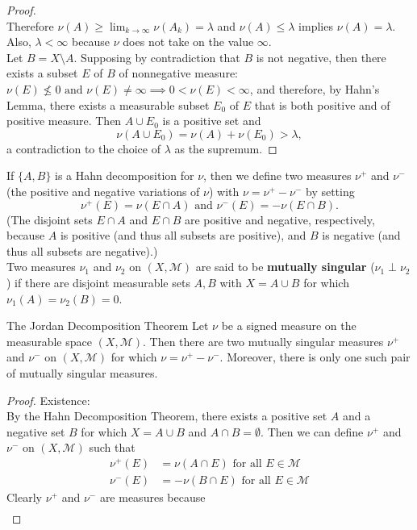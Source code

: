 \begin{flushleft}
\begin{proof}
\[		\]
		Therefore $\nu(A)\ge\lim_{k\to\infty}\nu(A_k)=\lambda$ and $\nu(A)\le\lambda$ implies $\nu(A)=\lambda$.
		Also, $\lambda<\infty$ because $\nu$ does not take on the value $\infty$.
		\\Let $B=X\setminus A$.
		Supposing by contradiction that $B$ is not negative, then there exists a subset $E$ of $B$ of nonnegative measure: $\nu(E)\not\le0\text{ and }\nu(E)\neq\infty\implies 0<\nu(E)<\infty$, and therefore, by Hahn's Lemma, there exists a measurable subset $E_0$ of $E$ that is both positive and of positive measure.
		Then $A\cup E_0$ is a positive set and 
		\[
			\nu(A\cup E_0)=\nu(A)+\nu(E_0)>\lambda,
		\]
		a contradiction to the choice of $\lambda$ as the supremum.
	\end{proof}
	If $\{A,B\}$ is a Hahn decomposition for $\nu$, then we define two measures $\nu^+$ and $\nu^-$ (the positive and negative variations of $\nu$) with $\nu=\nu^+-\nu^-$ by setting
	\[
		\nu^+(E)=\nu(E\cap A)\text{ and }\nu^-(E)=-\nu(E\cap B).	
	\]
	(The disjoint sets $E\cap A$ and $E\cap B$ are positive and negative, respectively, because $A$ is positive (and thus all subsets are positive), and $B$ is negative (and thus all subsets are negative).) 
	\\\bigskip Two measures $\nu_1$ and $\nu_2$ on $(X,\mathcal{M})$ are said to be \textbf{mutually singular} ($\nu_1\perp\nu_2$) if there are disjoint measurable sets $A,B$ with $X=A\cup B$ for which $\nu_1(A)=\nu_2(B)=0$.
	\begin{namedthm*}{The Jordan Decomposition Theorem}
		Let $\nu$ be a signed measure on the measurable space $(X,\mathcal{M})$. 
		Then there are two mutually singular measures $\nu^+$ and $\nu^-$ on $(X,\mathcal{M})$ for which $\nu=\nu^+-\nu^-$.
		Moreover, there is only one such pair of mutually singular measures.
	\end{namedthm*}
	\begin{proof}
		Existence:
		\\By the Hahn Decomposition Theorem, there exists a positive set $A$ and a negative set $B$ for which $X=A\cup B$ and $A\cap B=\emptyset$.
		Then we can define $\nu^+$ and $\nu^-$ on $(X,\mathcal{M})$ such that
		\begin{align*}
			\nu^+(E)&=\nu(A\cap E)\text{ for all }E\in\mathcal{M}\\
			\nu^-(E)&=-\nu(B\cap E)\text{ for all }E\in\mathcal{M}
		\end{align*}
		Clearly  $\nu^+$ and $\nu^-$ are measures because 
			\begin{align*}

\end{align*}
\end{proof}
\end{flushleft}
